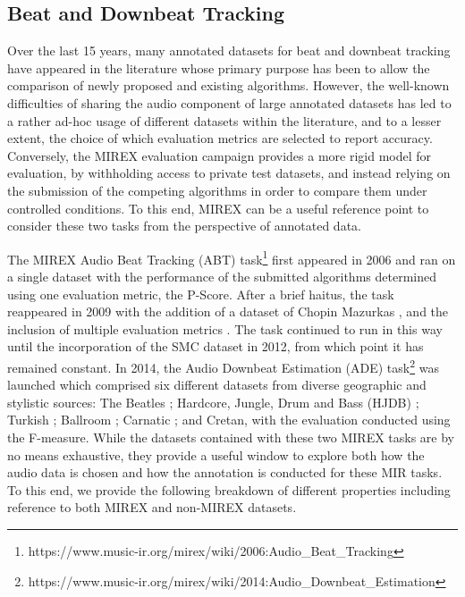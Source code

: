 \subsection{Beat and Downbeat Tracking}
Over the last 15 years, many annotated datasets for beat and downbeat tracking have appeared in the literature whose primary purpose has been to allow the comparison of newly proposed and existing algorithms. However, the well-known difficulties of sharing the audio component of large annotated datasets has led to a rather ad-hoc usage of different datasets within the literature, and to a lesser extent, the choice of which evaluation metrics are selected to report accuracy. Conversely, the MIREX evaluation campaign provides a more rigid model for evaluation, by withholding access to private test datasets, and instead relying on the submission of the competing algorithms in order to compare them under controlled conditions. To this end, MIREX can be a useful reference point to consider these two tasks from the perspective of annotated data.  

The MIREX Audio Beat Tracking (ABT) task\footnote{https://www.music-ir.org/mirex/wiki/2006:Audio\_Beat\_Tracking} first appeared in 2006 and ran on a single dataset \cite{moelants04icmpc,mckinney07jnmr} with the performance of the submitted algorithms determined using one evaluation metric, the P-Score. After a brief haitus, the task reappeared in 2009 with the addition of a dataset of Chopin Mazurkas \cite{sapp07ismir}, and the inclusion of multiple evaluation metrics \cite{davies09techreport}. The task continued to run in this way until the incorporation of the SMC dataset \cite{holzapfel12taslp} in 2012, from which point it has remained constant. In 2014, the Audio Downbeat Estimation (ADE) task\footnote{https://www.music-ir.org/mirex/wiki/2014:Audio\_Downbeat\_Estimation} was launched which comprised six different datasets from diverse geographic and stylistic sources: The Beatles \cite{Mauch2009a}; Hardcore, Jungle, Drum and Bass (HJDB) \cite{hockman12ismir}; Turkish \cite{srinivasamurthy14jnmr}; Ballroom \cite{krebs13ismir}; Carnatic \cite{srinivasamurthy14icassp}; and Cretan, with the evaluation conducted using the F-measure. While the datasets contained with these two MIREX tasks are by no means exhaustive, they provide a useful window to explore both how the audio data is chosen and how the annotation is conducted for these MIR tasks. To this end, we provide the following breakdown of different properties including reference to both MIREX and non-MIREX datasets. 

